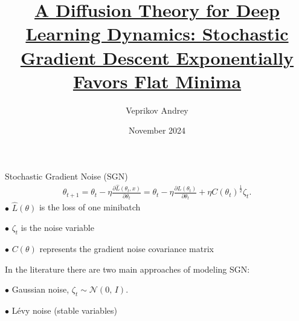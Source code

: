 \documentclass{beamer}
\title[\hbox to 56mm{\href{https://arxiv.org/pdf/2002.03495}{A Diffusion Theory for Deep Learning Dynamics: Stochastic Gradient Descent Exponentially Favors Flat Minima}}]{\href{https://arxiv.org/pdf/2002.03495}{A Diffusion Theory for Deep Learning Dynamics: Stochastic Gradient Descent Exponentially Favors Flat Minima}}
\author[Veprikov Andrey]{Veprikov Andrey}
\institute{Bayesian multimodeling \\
Department of Intelligent Systems, MIPT}
\date{November 2024}
\begin{document}
\begin{frame}
\thispagestyle{empty}
\maketitle
\end{frame}
\begin{frame}{Stochastic Gradient Noise (SGN)}
    \begin{align}
    \label{eq:SGDD}
    \theta_{t+1}  = \theta_{t} -  \eta \frac{\partial \hat{L}(\theta_{t},x)}{\partial \theta_{t}} =  \theta_{t} -  \eta \frac{\partial L(\theta_{t})}{\partial \theta_{t}} + \eta C(\theta_{t})^{\frac{1}{2}} \zeta_{t}.
    \end{align}
    $\bullet$ $\hat{L}(\theta)$ is the loss of one minibatch
    
    $\bullet$ $\zeta_{t}$ is the noise variable
    
    $\bullet$ $C(\theta)$ represents the gradient noise covariance matrix

    \vspace{3mm}

    In the literature there are two main approaches of modeling SGN:

    $\bullet$ Gaussian noise, $\zeta_{t}  \sim  \mathcal{N}(0,\,I) $. 
    
    $\bullet$ L\'evy noise (stable variables)
\end{frame}
\end{document}
